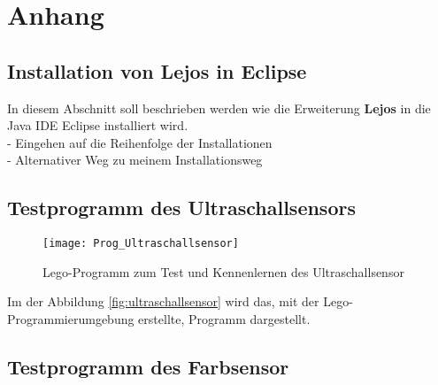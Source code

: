 \chapter{Anhang}
\section{Installation von Lejos in Eclipse}
In diesem Abschnitt soll beschrieben werden wie die Erweiterung \textbf{Lejos} in die Java IDE Eclipse installiert wird.\\ 
- Eingehen auf die Reihenfolge der Installationen\\
- Alternativer Weg zu meinem Installationsweg \\
\section{Testprogramm des Ultraschallsensors}
\begin{figure}[htb]
\centering
\texttt{[image: Prog\_Ultraschallsensor]}
\caption{Lego-Programm zum Test und Kennenlernen des Ultraschallsensor}
\label{fig:ultraschallsensor}
\end{figure}
Im der Abbildung \vref{fig:ultraschallsensor} wird das, mit der Lego-Programmierumgebung erstellte, Programm dargestellt. 
\section{Testprogramm des Farbsensor}

